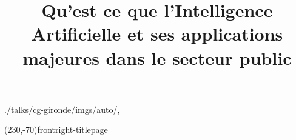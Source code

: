 

\title{Qu'est ce que l'Intelligence Artificielle et ses applications majeures dans le secteur public}


\usefootlinefortitlepage

\begin{graphicspathcontext}{{./talks/cg-gironde/imgs/auto/},\old}

	\settitlepagerightfigure(230,-70){frontright-titlepage}
\end{graphicspathcontext}




\OECDAIfalse

\endinput
